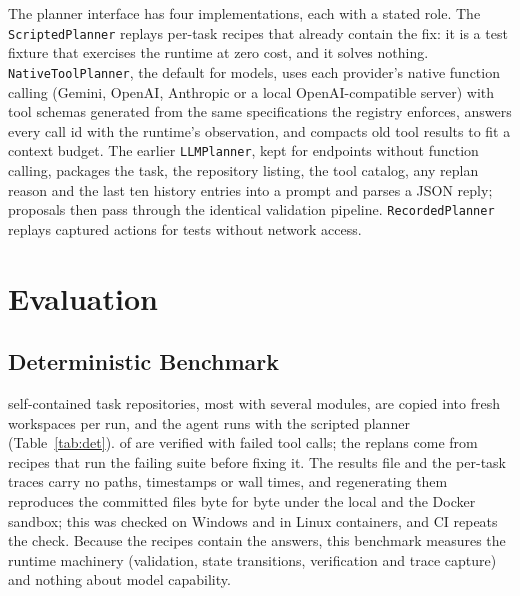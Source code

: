 \documentclass[conference]{IEEEtran}
\begin{document}
The planner interface has four implementations, each with a stated role.
The \texttt{ScriptedPlanner} replays per-task recipes that already
contain the fix: it is a test fixture that exercises the runtime at zero
cost, and it solves nothing. \texttt{NativeToolPlanner}, the default for
models, uses each provider's native function calling (Gemini, OpenAI,
Anthropic or a local OpenAI-compatible server) with tool schemas generated
from the same specifications the registry enforces, answers every call id
with the runtime's observation, and compacts old tool results to fit a
context budget. The earlier \texttt{LLMPlanner}, kept for endpoints without
function calling, packages the task, the
repository listing, the tool catalog, any replan reason and the last ten
history entries into a prompt and parses a JSON reply; proposals then pass
through the identical validation pipeline. \texttt{RecordedPlanner} replays
captured actions for tests without network access.

\section{Evaluation}
\label{sec:eval}

\subsection{Deterministic Benchmark}
\BenchTasks{} self-contained task repositories, most with several modules,
are copied into fresh workspaces per run, and the agent runs with the
scripted planner (Table~\ref{tab:det}). \BenchVerified{} of \BenchTasks{}
are verified with \BenchFailedCalls{} failed tool calls; the
\BenchReplans{} replans come from recipes that run the failing suite before
fixing it. The results file and the per-task traces carry no paths,
timestamps or wall times, and regenerating them reproduces the committed
files byte for byte under the local and the Docker sandbox; this was
checked on Windows and in Linux containers, and CI repeats the check. Because the recipes contain the answers,
this benchmark measures the runtime machinery (validation, state
transitions, verification and trace capture) and nothing about model
capability.

\begin{table}[t]
\centering
\caption{Deterministic benchmark (scripted planner, isolated workspace
copies).}
\label{tab:det}
\small

\end{table}
\end{document}
